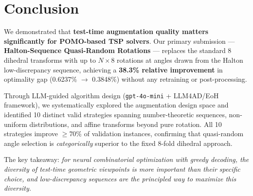 \documentclass[11pt,a4paper]{article}
\begin{document}
\section{Conclusion}
\label{sec:concl}

We demonstrated that \textbf{test-time augmentation quality matters
significantly for POMO-based TSP solvers}. Our primary submission ---
\textbf{Halton-Sequence Quasi-Random Rotations} --- replaces the standard 8
dihedral transforms with up to $N{\times}8$ rotations at angles drawn from
the Halton low-discrepancy sequence, achieving a \textbf{38.3\% relative
improvement} in optimality gap (0.6237\% $\to$ 0.3848\%) without any
retraining or post-processing.

Through LLM-guided algorithm design (\texttt{gpt-4o-mini} + LLM4AD/EoH
framework), we systematically explored the augmentation design space and
identified 10 distinct valid strategies spanning number-theoretic sequences,
non-uniform distributions, and affine transforms beyond pure rotation. All
10 strategies improve $\geq$70\% of validation instances, confirming that
quasi-random angle selection is \emph{categorically} superior to the fixed
8-fold dihedral approach.

The key takeaway: \emph{for neural combinatorial optimization with greedy
decoding, the diversity of test-time geometric viewpoints is more important
than their specific choice, and low-discrepancy sequences are the
principled way to maximize this diversity.}
\end{document}

